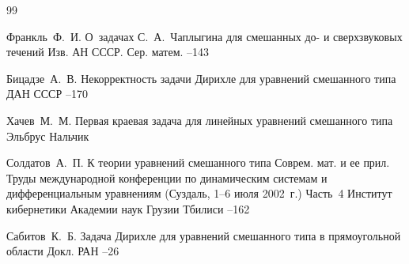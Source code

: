 \begin{thebibliography}{99}


\by Франкль~Ф.~И.
\paper О~задачах С.~А.~Чаплыгина для смешанных до- и сверхзвуковых течений
\jour Изв. АН СССР. Сер. матем.
--143

%
\by Бицадзе~А.~В.
\paper Некорректность задачи Дирихле для уравнений смешанного типа
\jour ДАН СССР
--170


\by Хачев~М.~М.
\book Первая краевая задача для линейных уравнений смешанного типа
\publ Эльбрус
\publaddr Нальчик


\by Солдатов~А.~П.
\paper К теории уравнений смешанного типа 
\serial Соврем. мат. и ее прил. 
\volinfo Труды международной конференции по динамическим системам и дифференциальным уравнениям (Суздаль, 1–6 июля 2002~г.) Часть~4 
\publ Институт кибернетики Академии наук Грузии
\publaddr Тбилиси
--162


\by Сабитов~К.~Б.
\paper Задача Дирихле для уравнений смешанного типа в прямоугольной области
\jour Докл. РАН
--26


\end{thebibliography}
